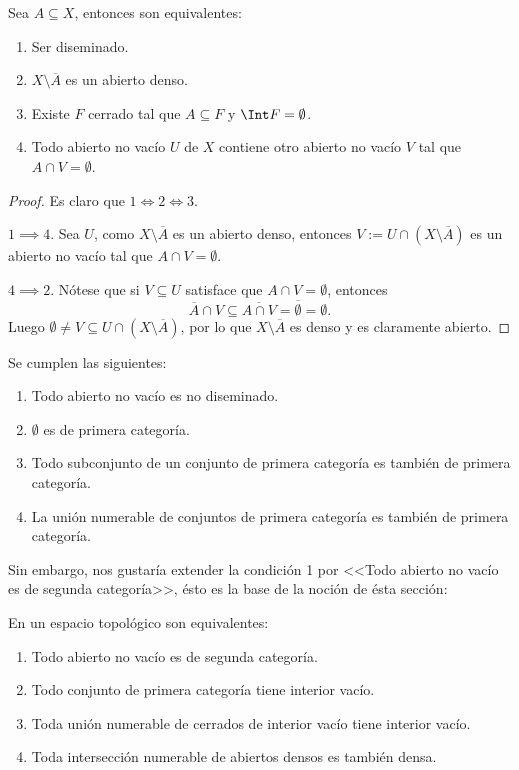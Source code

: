 \documentclass[topologia-analisis.tex]{subfiles}
\begin{document}
\begin{prop}
	Sea $A \subseteq X$, entonces son equivalentes:
	\begin{enumerate}
		\item Ser diseminado.
		\item $X \setminus \overline A$ es un abierto denso.
		\item Existe $F$ cerrado tal que $A \subseteq F$ y $\Int F = \emptyset$.
		\item Todo abierto no vacío $U$ de $X$ contiene otro abierto no vacío $V$ tal que $A \cap V = \emptyset$.
	\end{enumerate}
\end{prop}
\begin{proof}
	Es claro que $1 \iff 2 \iff 3$.

	$1\implies 4$. Sea $U$, como $X \setminus \overline A$ es un abierto denso, entonces $V := U\cap(X\setminus\overline A)$ es un abierto
	no vacío tal que $A\cap V = \emptyset$.

	$4\implies 2$. Nótese que si $V \subseteq U$ satisface que $A\cap V = \emptyset$, entonces
	\[
		\overline{A} \cap V \subseteq \overline{A\cap V} = \overline\emptyset = \emptyset.
	\]
	Luego $\emptyset \ne V \subseteq U \cap (X \setminus \overline A)$, por lo que $X \setminus \overline A$ es denso y es claramente abierto.
\end{proof}

\begin{prop}
	Se cumplen las siguientes:
	\begin{enumerate}
		\item Todo abierto no vacío es no diseminado.
		\item $\emptyset$ es de primera categoría.
		\item Todo subconjunto de un conjunto de primera categoría es también de primera categoría.
		\item La unión numerable de conjuntos de primera categoría es también de primera categoría.
	\end{enumerate}
\end{prop}
Sin embargo, nos gustaría extender la condición 1 por <<Todo abierto no vacío es de segunda categoría>>, ésto es la base de la noción de ésta sección:

\addtocounter{thmi}{1}
\begin{slem}
	En un espacio topológico son equivalentes:
	\begin{enumerate}
		\item Todo abierto no vacío es de segunda categoría.
		\item Todo conjunto de primera categoría tiene interior vacío.
		\item Toda unión numerable de cerrados de interior vacío tiene interior vacío.
		\item Toda intersección numerable de abiertos densos es también densa.
	\end{enumerate}
\end{slem}
\addtocounter{thmi}{-1}
\end{document}

